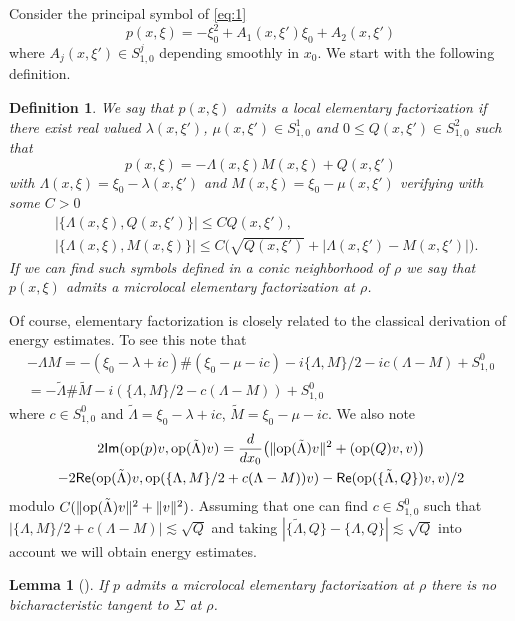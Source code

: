 \documentclass[12pt,leqno]{article} %
\def\op#1{{\rm op}(#1)}
\def\La{\Lambda}
\def\la{\lambda}
\numberwithin{equation}{section}
\newtheorem{definition}{Definition}[section]
\newtheorem{lem}{Lemma}[section]
\begin{document}
Consider the principal symbol of \eqref{eq:1}
%
\begin{equation}
\label{eq:kojaku:ee}
p(x,\xi)=-\xi_0^2+A_{1}(x,\xi')\xi_0+A_{2}(x,\xi')
\end{equation}
% 
where $A_j(x,\xi')\in S^j_{1,0}$ depending smoothly in $x_0$. We start with the following definition.
%
\begin{definition}
\label{dfn:one}\rm
 We say that $p(x,\xi)$ admits a local elementary factorization if there exist real valued $\lambda(x,\xi')$, $\mu(x,\xi')\in S^1_{1,0}$ and $0\leq Q(x,\xi')\in S^2_{1,0}$ such that 
%
\[
p(x,\xi)=-\Lambda(x,\xi)M(x,\xi)+Q(x,\xi')
\]
%
with $\Lambda(x,\xi)=\xi_0-\lambda(x,\xi')$ and $M(x,\xi)=\xi_0-\mu(x,\xi')$ verifying with some $C>0$ 
%
\begin{eqnarray}
\label{eq:LaMQ}
&|\{\Lambda(x,\xi),Q(x,\xi')\}|\leq CQ(x,\xi'),\\
\label{eq:LAMQbis}
&|\{\Lambda(x,\xi),M(x,\xi)\}|\leq C \big(\sqrt{Q(x,\xi')}+|\Lambda(x,\xi')-M(x,\xi')|\big).
\end{eqnarray}
%
If we can find such symbols defined in a conic neighborhood of $\rho$ we say that $p(x,\xi)$ admits a microlocal elementary factorization at $\rho$. 
\end{definition}
%
Of course, elementary factorization is closely related to the classical derivation of energy estimates. To see this note that
%
\begin{gather*}
-\La M=-(\xi_0-\la+ic)\#(\xi_0-\mu-ic)-i\{\La, M\}/2-ic(\La-M)+S^0_{1,0}\\
=-\tilde\La\#\tilde M-i(\{\La, M\}/2-c(\La-M))+S^0_{1,0}
\end{gather*}
%
where $c\in S^0_{1,0}$ and $
\tilde\La=\xi_0-\la+ic$, $\tilde M=\xi_0-\mu-ic$. We also note 
%
\begin{gather*}
2{\mathsf{Im}}(\op{p}v, \op{\tilde\La}v)=\frac{d}{dx_0}\big(\|\op{\tilde\La}v\|^2+(\op{Q}v,v)\big)\\
-2{\mathsf{Re}}(\op{\tilde\La}v, \op{\{\La, M\}/2+c(\La-M)}v)
-{\mathsf{Re}}(\op{\{\tilde\La, Q\}}v, v)/2
\end{gather*}
%
modulo $C(\|\op{\tilde\La}v\|^2+\|v\|^2)$. Assuming that one can find $c\in S^0_{1,0}$ such that $|\{\La, M\}/2+c(\La-M)|\lesssim \sqrt{Q}$ and taking $|\{\tilde\La,Q\}-\{\La,Q\}|\lesssim\sqrt{Q}$ into account we will obtain energy estimates.
%
\begin{lem}[\cite{zbMATH03625907}] 
\label{lem:fact:bicha} If $p$ admits a microlocal elementary factorization at $\rho$ there is no bicharacteristic tangent to $\Sigma$ at $\rho$.
\end{lem}
\end{document}
